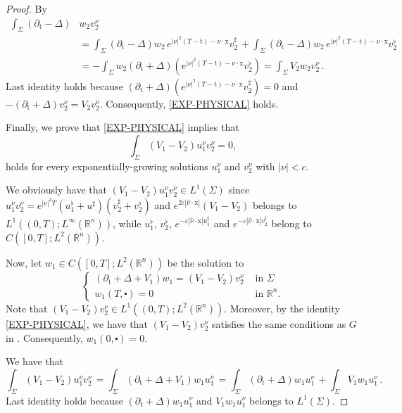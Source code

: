 \documentclass[10pt,a4paper]{amsart}
\newcommand{\R}{\mathbb{R}}
\newcommand{\tm}{\mathrm{t}}
\newcommand{\x}{\mathrm{x}}
\begin{document}
\begin{proof}
By 
\begin{align*}
\int_{\Sigma}\left( \partial_{\tm}-\Delta\right)& w_{2} v_{2}^{\nu} \, \\
& = \int_{\Sigma}\left( \partial_{\tm}-\Delta\right) w_{2} \, e^{|\nu|^2 (T - \tm) - \nu \cdot \x} v_2^\sharp \, + \int_{\Sigma}\left( \partial_{\tm}-\Delta\right) w_{2} \, e^{|\nu|^2 (T - \tm) - \nu \cdot \x} v_2^\flat \, \\
& = - \int_{\Sigma} w_2 \left( \partial_{\tm}+\Delta\right)(e^{|\nu|^2 (T - \tm) - \nu \cdot \x} v_2^\flat) = \int_{\Sigma} V_{2} w_{2} v_{2}^{\nu} \, .
\end{align*}
Last identity holds because 
$\left( \partial_{\tm}+\Delta\right)(e^{|\nu|^2 (T - \tm) - \nu \cdot \x} v_2^\sharp) = 0$ and
$-\left( \partial_{\tm}+\Delta\right) v_2^\nu = V_2 v_2^\nu$. Consequently, \eqref{EXP-PHYSICAL} holds.

Finally, we prove that \eqref{EXP-PHYSICAL} implies that
\begin{equation}\label{EXP-EXP}
\int_{\Sigma}\left(V_{1}-V_{2}\right) u_{1}^{\nu} v_{2}^{\nu}=0,
\end{equation}
holds for every exponentially-growing solutions $u_1^\nu$ and $v_{2}^{\nu}$ with $|\nu| < c$.

We obviously have that $(V_1 - V_2) u^\nu_1 v_2^\nu \in L^1(\Sigma)$ since
$u^\nu_1 v_2^\nu = e^{|\nu|^2 T} (u^\flat_1 + u^\sharp) (v_2^\sharp + v_2^\flat)$ and
$ e^{2 \varepsilon |\hat \nu \cdot \x|} (V_1 - V_2)$
belongs to $L^1((0,T); L^\infty(\R^n))$, while $u_1^\flat$, $v_2^\flat$, 
$e^{-\varepsilon |\hat \nu \cdot \x| u_1^\sharp}$ and 
$e^{-\varepsilon |\hat \nu \cdot \x| v_2^\sharp}$ belong to
$C([0, T] ; L^{2}(\mathbb{R}^{n}))$.

Now, let $w_{1} \in C([0, T] ; L^{2}(\mathbb{R}^{n}))$ be the solution to 
$$
\begin{cases}\left( \partial_{\tm}+\Delta+V_{1}\right) w_{1}=\left(V_{1}-V_{2}\right)v_{2}^{\nu} & \text { in } \Sigma \\ w_{1}(T, \centerdot)=0 & \text { in } \mathbb{R}^{n}.\end{cases}
$$
Note that $(V_{1}-V_{2})v_2^\nu \in L^{1}((0, T) ; L^{2}(\mathbb{R}^{n}))$.  Moreover, by 
the identity \eqref{EXP-PHYSICAL},
we have that $(V_{1}-V_{2})v_2^\nu$ satisfies the same conditions as $G$ in 
. Consequently, $w_1(0, \centerdot)= 0$.

We have that
\[\int_{\Sigma}\left(V_{1}-V_{2}\right) u_{1}^\nu v_{2}^{\nu} \, = \int_{\Sigma}\left( \partial_{\tm}+\Delta+V_1\right) w_1 u_1^{\nu} \, = \int_{\Sigma}\left( \partial_{\tm}+\Delta\right) w_1 u_1^{\nu} \, + \int_{\Sigma} V_1 w_1 u_1^{\nu} \, .
\]
Last identity holds because $\left( \partial_{\tm}+\Delta\right) w_1 u_1^{\nu}$ and 
$V_1 w_1 u_1^{\nu}$ belongs to $L^1(\Sigma)$.


\end{proof}
\end{document}
